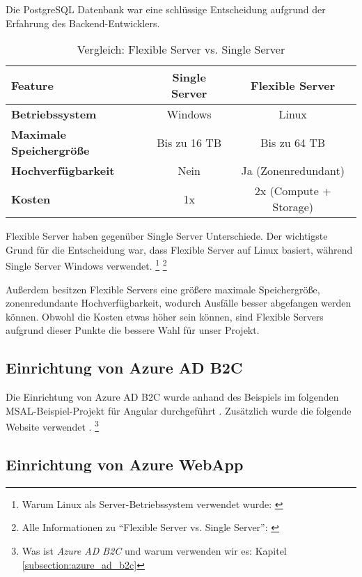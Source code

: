Die PostgreSQL Datenbank war eine schlüssige Entscheidung aufgrund der Erfahrung des Backend-Entwicklers.

\begin{table}[h t]
    \centering
    \caption{Vergleich: Flexible Server vs. Single Server}
    \label{tab:azure-postgresql}
    \begin{tabular}{lcc}
    \hline
    \textbf{Feature}                & \textbf{Single Server} & \textbf{Flexible Server} \\ \hline
    \textbf{Betriebssystem}         & Windows                & Linux                    \\
    \textbf{Maximale Speichergrö\ss{}e} & Bis zu 16 TB           & Bis zu 64 TB             \\
    \textbf{Hochverfügbarkeit}      & Nein                   & Ja (Zonenredundant)      \\
    \textbf{Kosten}                 & 1x                     & 2x (Compute + Storage)   \\ \hline
    \end{tabular}
\end{table}

Flexible Server haben gegenüber Single Server Unterschiede. 
Der wichtigste Grund für die Entscheidung war, dass Flexible Server auf Linux basiert, 
während Single Server Windows verwendet. 
\footnote{Warum Linux als Server-Betriebssystem verwendet wurde: \cite{hussain2015survey}}
\footnote{Alle Informationen zu ``Flexible Server vs. Single Server'': \cite{MicrosoftCorporatione}}

Au\ss{}erdem besitzen Flexible Servers eine grö\ss{}ere maximale Speichergrö\ss{}e, zonenredundante Hochverfügbarkeit, 
wodurch Ausfälle besser abgefangen werden können. Obwohl die Kosten etwas höher sein können, 
sind Flexible Servers aufgrund dieser Punkte die bessere Wahl für unser Projekt.

\subsection{Einrichtung von Azure AD B2C}

Die Einrichtung von Azure AD B2C wurde anhand des Beispiels im folgenden MSAL-Beispiel-Projekt
für Angular durchgeführt \cite{MicrosoftCorporationh}. Zusätzlich wurde die folgende
Website verwendet \cite{MicrosoftCorporationg}.
\footnote{Was ist \emph{Azure AD B2C} und warum verwenden wir es: Kapitel \ref{subsection:azure_ad_b2c}}

\subsection{Einrichtung von Azure WebApp}

